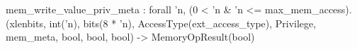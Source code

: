 mem_write_value_priv_meta : forall 'n, (0 < 'n & 'n <= max_mem_access).
  (xlenbits, int('n), bits(8 * 'n), AccessType(ext_access_type), Privilege, mem_meta, bool, bool, bool) -> MemoryOpResult(bool)